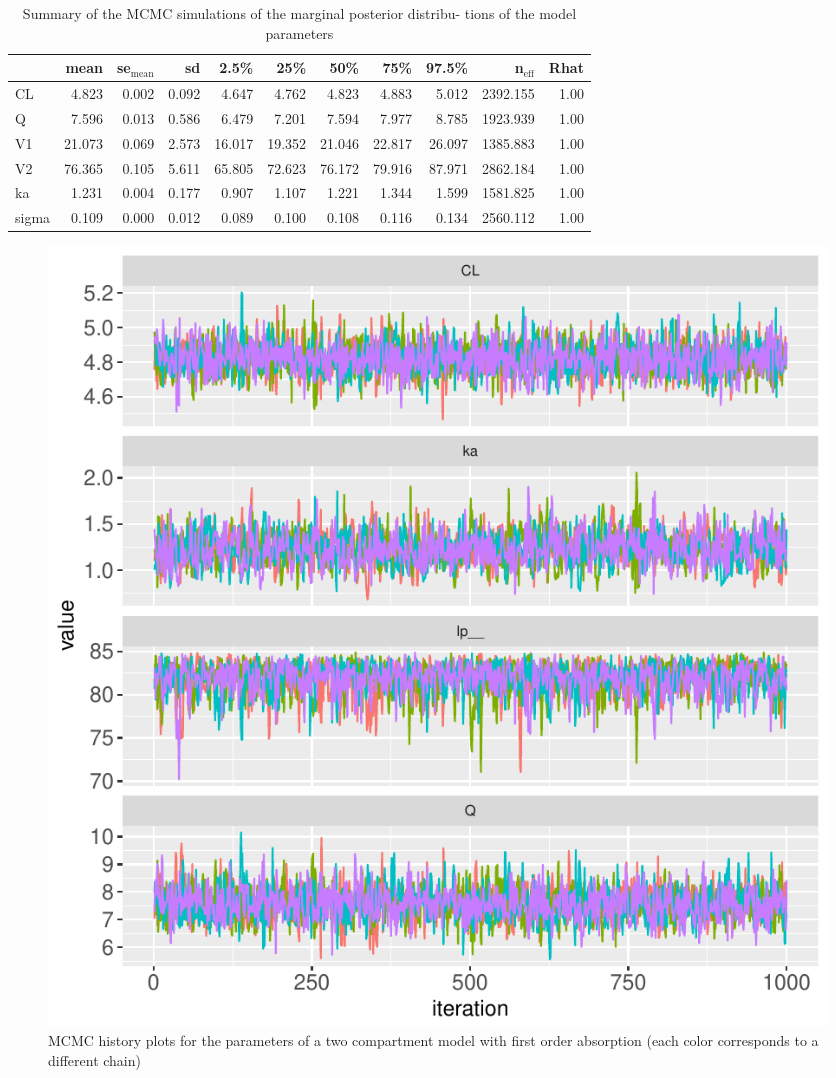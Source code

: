 \documentclass[11pt, reqno, oneside]{amsbook}
\numberwithin{equation}{chapter}
\numberwithin{figure}{chapter}
\numberwithin{table}{chapter}
\theoremstyle{remark}
\begin{document}
\begin{table}[htbp]
\centering
\begin{tabular}{lrrrrrrrrrr}
\hline
 & mean & se\(_{\text{mean}}\) & sd & 2.5\% & 25\% & 50\% & 75\% & 97.5\% & n\(_{\text{eff}}\) & Rhat\\
\hline
CL & 4.823 & 0.002 & 0.092 & 4.647 & 4.762 & 4.823 & 4.883 & 5.012 & 2392.155 & 1.00\\
Q & 7.596 & 0.013 & 0.586 & 6.479 & 7.201 & 7.594 & 7.977 & 8.785 & 1923.939 & 1.00\\
V1 & 21.073 & 0.069 & 2.573 & 16.017 & 19.352 & 21.046 & 22.817 & 26.097 & 1385.883 & 1.00\\
V2 & 76.365 & 0.105 & 5.611 & 65.805 & 72.623 & 76.172 & 79.916 & 87.971 & 2862.184 & 1.00\\
ka & 1.231 & 0.004 & 0.177 & 0.907 & 1.107 & 1.221 & 1.344 & 1.599 & 1581.825 & 1.00\\
sigma & 0.109 & 0.000 & 0.012 & 0.089 & 0.100 & 0.108 & 0.116 & 0.134 & 2560.112 & 1.00\\
\hline
\end{tabular}
\caption{\label{tab:twocpt_summary}
Summary of the MCMC simulations of the marginal posterior distribu- tions of the model parameters}

\end{table}

\begin{figure}[htbp]
\centering
\includegraphics[width=0.6\linewidth]{../example-models/R/deliv/figure/TwoCptModel/TwoCptModelPlots001.pdf}
\caption{\label{twocpt_mcmc_history}
MCMC history plots for the parameters of a two compartment model with first order absorption (each color corresponds to a different chain)}
\end{figure}
\end{document}

